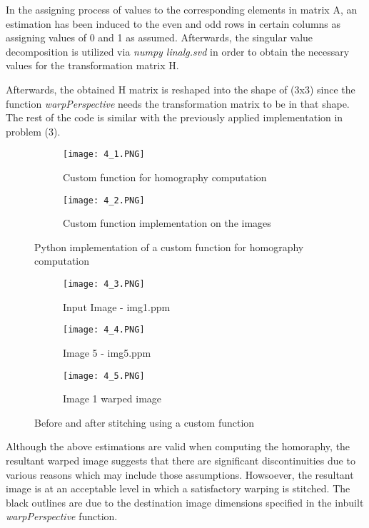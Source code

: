 \documentclass[11pt]{scrartcl}
\begin{document}
{In the assigning process of values to the corresponding elements in matrix A, an estimation has been induced to the even and odd rows in certain columns as assigning values of 0 and 1 as assumed. Afterwards, the singular value decomposition is utilized via \textit{numpy linalg.svd} in order to obtain the necessary values for the transformation matrix H.

Afterwards, the obtained H matrix is reshaped into the shape of (3x3) since the function \textit{warpPerspective} needs the transformation matrix to be in that shape. The rest of the code is similar with the previously applied implementation in problem (3).

\begin{figure}[H]
\centering
\begin{subfigure}{0.4\textwidth}
  \centering
  \texttt{[image: 4\_1.PNG]}
  \caption{Custom function for homography computation}
  \label{fig:sub2}
\end{subfigure}
\begin{subfigure}{0.4\textwidth}
  \centering
  \texttt{[image: 4\_2.PNG]}
  \caption{Custom function implementation on the images}
  \label{fig:sub2}
\end{subfigure}
\caption{Python implementation of a custom function for homography computation}
\label{fig:test}
\end{figure}

\begin{figure}[H]
\centering
\begin{subfigure}{0.4\textwidth}
  \centering
  \texttt{[image: 4\_3.PNG]}
  \caption{Input Image - img1.ppm}
  \label{fig:sub2}
\end{subfigure}
\begin{subfigure}{0.4\textwidth}
  \centering
  \texttt{[image: 4\_4.PNG]}
  \caption{Image 5 - img5.ppm}
  \label{fig:sub2}
\end{subfigure}
\begin{subfigure}{0.4\textwidth}
  \centering
  \texttt{[image: 4\_5.PNG]}
  \caption{Image 1 warped image}
  \label{fig:sub2}
\end{subfigure}
\caption{Before and after stitching using a custom function}
\label{fig:test}
\end{figure}

Although the above estimations are valid when computing the homoraphy, the resultant warped image suggests that there are significant discontinuities due to various reasons which may include those assumptions. Howsoever, the resultant image is at an acceptable level in which a satisfactory warping is stitched. The black outlines are due to the destination image dimensions specified in the inbuilt \textit{warpPerspective} function. 

}
\end{document}
